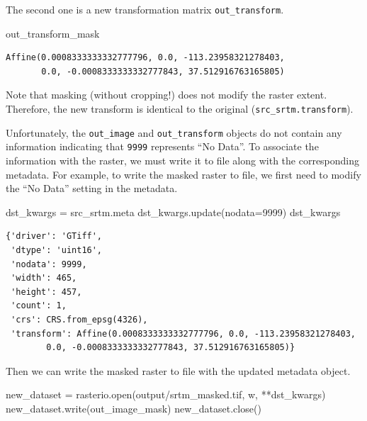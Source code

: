 \documentclass[
  letterpaper,
]{krantz}
\newenvironment{Shaded}{\begin{snugshade}}{\end{snugshade}}
\newcommand{\BuiltInTok}[1]{\textcolor[rgb]{0.00,0.23,0.31}{#1}}
\newcommand{\DecValTok}[1]{\textcolor[rgb]{0.68,0.00,0.00}{#1}}
\newcommand{\NormalTok}[1]{\textcolor[rgb]{0.00,0.23,0.31}{#1}}
\newcommand{\OperatorTok}[1]{\textcolor[rgb]{0.37,0.37,0.37}{#1}}
\newcommand{\StringTok}[1]{\textcolor[rgb]{0.13,0.47,0.30}{#1}}
\begin{document}
The second one is a new transformation matrix \texttt{out\_transform}.

\begin{Shaded}
\begin{Highlighting}[]
\NormalTok{out\_transform\_mask}
\end{Highlighting}
\end{Shaded}

\begin{verbatim}
Affine(0.0008333333332777796, 0.0, -113.23958321278403,
       0.0, -0.0008333333332777843, 37.512916763165805)
\end{verbatim}

Note that masking (without cropping!) does not modify the raster extent.
Therefore, the new transform is identical to the original
(\texttt{src\_srtm.transform}).

Unfortunately, the \texttt{out\_image} and \texttt{out\_transform}
objects do not contain any information indicating that \texttt{9999}
represents ``No Data''. To associate the information with the raster, we
must write it to file along with the corresponding metadata. For
example, to write the masked raster to file, we first need to modify the
``No Data'' setting in the metadata.

\begin{Shaded}
\begin{Highlighting}[]
\NormalTok{dst\_kwargs }\OperatorTok{=}\NormalTok{ src\_srtm.meta}
\NormalTok{dst\_kwargs.update(nodata}\OperatorTok{=}\DecValTok{9999}\NormalTok{)}
\NormalTok{dst\_kwargs}
\end{Highlighting}
\end{Shaded}

\begin{verbatim}
{'driver': 'GTiff',
 'dtype': 'uint16',
 'nodata': 9999,
 'width': 465,
 'height': 457,
 'count': 1,
 'crs': CRS.from_epsg(4326),
 'transform': Affine(0.0008333333332777796, 0.0, -113.23958321278403,
        0.0, -0.0008333333332777843, 37.512916763165805)}
\end{verbatim}

Then we can write the masked raster to file with the updated metadata
object.

\begin{Shaded}
\begin{Highlighting}[]
\NormalTok{new\_dataset }\OperatorTok{=}\NormalTok{ rasterio.}\BuiltInTok{open}\NormalTok{(}\StringTok{\textquotesingle{}output/srtm\_masked.tif\textquotesingle{}}\NormalTok{, }\StringTok{\textquotesingle{}w\textquotesingle{}}\NormalTok{, }\OperatorTok{**}\NormalTok{dst\_kwargs)}
\NormalTok{new\_dataset.write(out\_image\_mask)}
\NormalTok{new\_dataset.close()}
\end{Highlighting}
\end{Shaded}
\end{document}
